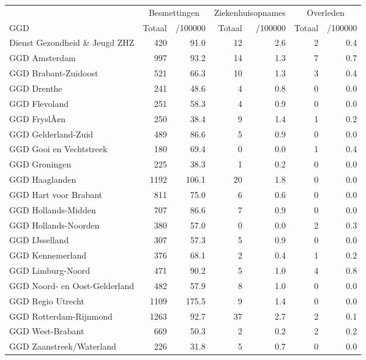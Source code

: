 \documentclass[
  english,
  man,floatsintext]{apa6}
\begin{document}
\begin{table}
\centering\begingroup\fontsize{10}{12}\selectfont

\begin{threeparttable}
\begin{tabular}{lrrrrrr}
\toprule
\multicolumn{1}{c}{ } & \multicolumn{2}{c}{Besmettingen} & \multicolumn{2}{c}{Ziekenhuisopnames} & \multicolumn{2}{c}{Overleden} \\
\cmidrule(l{3pt}r{3pt}){2-3} \cmidrule(l{3pt}r{3pt}){4-5} \cmidrule(l{3pt}r{3pt}){6-7}
GGD & Totaal & /100000 & Totaal & /100000 & Totaal & /100000\\
\midrule
Dienst Gezondheid \& Jeugd ZHZ & 420 & 91.0 & 12 & 2.6 & 2 & 0.4\\
GGD Amsterdam & 997 & 93.2 & 14 & 1.3 & 7 & 0.7\\
GGD Brabant-Zuidoost & 521 & 66.3 & 10 & 1.3 & 3 & 0.4\\
GGD Drenthe & 241 & 48.6 & 4 & 0.8 & 0 & 0.0\\
GGD Flevoland & 251 & 58.3 & 4 & 0.9 & 0 & 0.0\\
GGD FryslÃ¢n & 250 & 38.4 & 9 & 1.4 & 1 & 0.2\\
GGD Gelderland-Zuid & 489 & 86.6 & 5 & 0.9 & 0 & 0.0\\
GGD Gooi en Vechtstreek & 180 & 69.4 & 0 & 0.0 & 1 & 0.4\\
GGD Groningen & 225 & 38.3 & 1 & 0.2 & 0 & 0.0\\
GGD Haaglanden & 1192 & 106.1 & 20 & 1.8 & 0 & 0.0\\
GGD Hart voor Brabant & 811 & 75.0 & 6 & 0.6 & 0 & 0.0\\
GGD Hollands-Midden & 707 & 86.6 & 7 & 0.9 & 0 & 0.0\\
GGD Hollands-Noorden & 380 & 57.0 & 0 & 0.0 & 2 & 0.3\\
GGD IJsselland & 307 & 57.3 & 5 & 0.9 & 0 & 0.0\\
GGD Kennemerland & 376 & 68.1 & 2 & 0.4 & 1 & 0.2\\
GGD Limburg-Noord & 471 & 90.2 & 5 & 1.0 & 4 & 0.8\\
GGD Noord- en Oost-Gelderland & 482 & 57.9 & 8 & 1.0 & 0 & 0.0\\
GGD Regio Utrecht & 1109 & 175.5 & 9 & 1.4 & 0 & 0.0\\
GGD Rotterdam-Rijnmond & 1263 & 92.7 & 37 & 2.7 & 2 & 0.1\\
GGD West-Brabant & 669 & 50.3 & 2 & 0.2 & 2 & 0.2\\
GGD Zaanstreek/Waterland & 226 & 31.8 & 5 & 0.7 & 0 & 0.0\\

\end{tabular}
\end{threeparttable}
\end{table}
\end{document}
